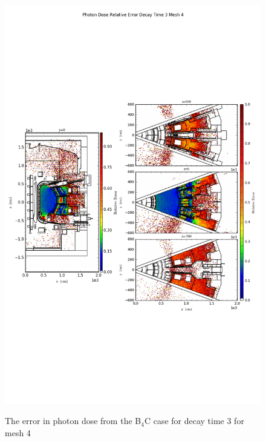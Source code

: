 \begin{figure}[ht!]
\centering
\includegraphics[trim={0cm 9cm 0cm 10cm},clip,scale=0.75]{../plots/final_model_with_b4c/Photon_Dose_Relative_Error_Decay_Time_3_Mesh_4.png}
\label{fig:photons_dc3_no4bc_m4_error}
\caption{The error in photon dose from the B$_4$C case for decay time 3 for mesh 4}
\end{figure}
